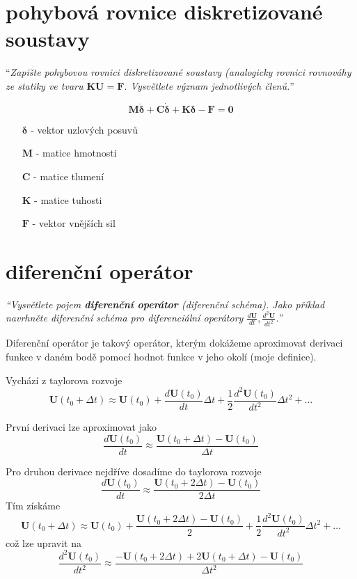\documentclass{article}
\begin{document}
	\section{pohybová rovnice diskretizované soustavy}
	``\emph{Zapište pohybovou rovnici diskretizované soustavy (analogicky rovnici rovnováhy ze statiky ve tvaru $\bm{K}\bm{U} = \bm{F}$. Vysvětlete význam jednotlivých členů.}''

	\begin{equation}
		\bm{M}\bm{\ddot{\delta}} + \bm{C}\bm{\dot{\delta}} + \bm{K}\bm{\delta} - \bm{F} = \bm{0}
	\end{equation}
	\begin{itemize}
		\item [$\bm{\delta}$] - vektor uzlových posuvů
		\item [$\bm{M}$] - matice hmotnosti
		\item [$\bm{C}$] - matice tlumení
		\item [$\bm{K}$] - matice tuhosti
		\item [$\bm{F}$] - vektor vnějších sil
	\end{itemize}

	\section{diferenční operátor}
	\emph{``Vysvětlete pojem \textbf{diferenční operátor} (diferenční schéma). Jako příklad navrhněte diferenční schéma pro diferenciální operátory $\frac{d\bm{U}}{dt},\frac{d^2\bm{U}}{dt^2}$.''}

	Diferenční operátor je takový operátor, kterým dokážeme aproximovat derivaci funkce v daném bodě pomocí hodnot funkce v jeho okolí (moje definice).
	
	Vychází z taylorova rozvoje
	\begin{equation}
		\bm{U}(t_0+\Delta t) \approx \bm{U}(t_0) + \frac{d\bm{U}(t_0)}{dt} \Delta t + \frac{1}{2} \frac{d^2\bm{U}(t_0)}{dt^2} \Delta t^2 + \dots
	\end{equation}
	
	První derivaci lze aproximovat jako
	\begin{equation}
		\frac{d\bm{U}(t_0)}{dt} \approx \frac{\bm{U}(t_0+\Delta t) - \bm{U}(t_0)}{\Delta t}
	\end{equation}
	
	Pro druhou derivace nejdříve dosadíme do taylorova rozvoje
	\begin{equation}
		\frac{d\bm{U}(t_0)}{dt} \approx \frac{\bm{U}(t_0+2\Delta t) - \bm{U}(t_0)}{2\Delta t}
	\end{equation}
	Tím získáme
	\begin{equation}
		\bm{U}(t_0+\Delta t) \approx \bm{U}(t_0) + \frac{\bm{U}(t_0+2\Delta t) - \bm{U}(t_0)}{2} + \frac{1}{2} \frac{d^2\bm{U}(t_0)}{dt^2} \Delta t^2 + \dots
	\end{equation}
	což lze upravit na
	\begin{equation}
		\frac{d^2\bm{U}(t_0)}{dt^2}
		\approx
		\frac{ -\bm{U}(t_0+2\Delta t) + 2\bm{U}(t_0+\Delta t) - \bm{U}(t_0) }{\Delta t^2}
	\end{equation}
\end{document}
